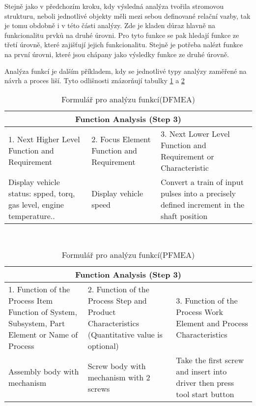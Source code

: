 Stejně jako v předchozím kroku, kdy výsledná analýza tvořila stromovou strukturu, neboli jednotlivé objekty měli mezi sebou definované relační vazby, tak je tomu obdobně i v této části analýzy. Zde je kladen důraz hlavně na funkcionalitu prvků na druhé úrovni. Pro tyto funkce se pak hledají funkce ze třetí úrovně, které zajišťují jejich funkcionalitu. Stejně je potřeba nalézt funkce na první úrovni, které jsou chápany jako výsledky funkce ze druhé úrovně. 

Analýza funkcí je dalším příkladem, kdy se jednotlivé typy analýzy zaměřené na návrh a proces liší. Tyto odlišnosti znázorňují tabulky \ref{tab:function_DFMEA} a \ref{tab:function_PFMEA} 

\begin{center}
\begin{table}[h]
	\centering
	\caption{Formulář pro analýzu funkcí(DFMEA) }
	\label{tab:function_DFMEA}
\begin{tabular}{ |p{5cm}|p{4cm}|p{4cm}|  }
 \hline
 \multicolumn{3}{|c|}{Function Analysis (Step 3)} \\
 \hline
 1. Next Higher Level Function and Requirement &
2. Focus Element
Function and Requirement &
3. Next Lower Level Function and Requirement or Characteristic\\
 \hline
 Display vehicle status: spped, torq, gas level, engine temperature..   & Display vehicle speed    & Convert a train of input pulses into a precisely defined increment in the shaft position\\


 \hline
\end{tabular}\  
\end{table}
\end{center}

\begin{center}
\begin{table}[h]
	\centering
	\caption{Formulář pro analýzu funkcí(PFMEA) }
	\label{tab:function_PFMEA}
\begin{tabular}{ |p{5cm}|p{4cm}|p{4cm}|  }
 \hline
 \multicolumn{3}{|c|}{Function Analysis (Step 3)} \\
 \hline
1. Function of the Process Item
Function of System, Subsystem, Part Element or Name of Process
& 2. Function of the Process Step and Product Characteristics
(Quantitative value is optional)
& 3. Function of the Process Work Element and Process Characteristics
\\
 \hline
Assembly body with mechanism   & Screw body with mechanism with 2 screws   &Take the first screw and insert into driver then press tool start button\\


 \hline
\end{tabular}\  
\end{table}
\end{center}

